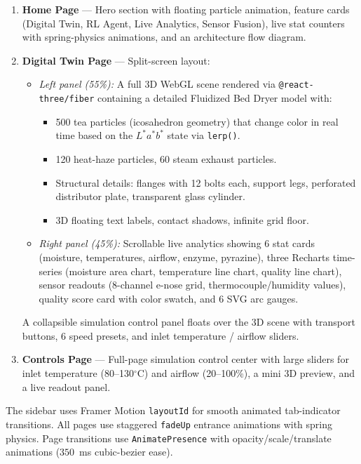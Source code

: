 ﻿\documentclass[12pt, a4paper]{report}
\begin{document}
\begin{enumerate}
    \item \textbf{Home Page} --- Hero section with floating particle animation, feature cards (Digital Twin, RL Agent, Live Analytics, Sensor Fusion), live stat counters with spring-physics animations, and an architecture flow diagram.

    \item \textbf{Digital Twin Page} --- Split-screen layout:
    \begin{itemize}
        \item \emph{Left panel (55\%):} A full 3D WebGL scene rendered via \texttt{@react-three/fiber} containing a detailed Fluidized Bed Dryer model with:
        \begin{itemize}
            \item 500 tea particles (icosahedron geometry) that change color in real time based on the $L^*a^*b^*$ state via \texttt{lerp()}.
            \item 120 heat-haze particles, 60 steam exhaust particles.
            \item Structural details: flanges with 12 bolts each, support legs, perforated distributor plate, transparent glass cylinder.
            \item 3D floating text labels, contact shadows, infinite grid floor.
        \end{itemize}
        \item \emph{Right panel (45\%):} Scrollable live analytics showing 6 stat cards (moisture, temperatures, airflow, enzyme, pyrazine), three Recharts time-series (moisture area chart, temperature line chart, quality line chart), sensor readouts (8-channel e-nose grid, thermocouple/humidity values), quality score card with color swatch, and 6 SVG arc gauges.
    \end{itemize}
    A collapsible simulation control panel floats over the 3D scene with transport buttons, 6 speed presets, and inlet temperature / airflow sliders.

    \item \textbf{Controls Page} --- Full-page simulation control center with large sliders for inlet temperature (80--130$^\circ$C) and airflow (20--100\%), a mini 3D preview, and a live readout panel.
\end{enumerate}

The sidebar uses Framer Motion \texttt{layoutId} for smooth animated tab-indicator transitions. All pages use staggered \texttt{fadeUp} entrance animations with spring physics. Page transitions use \texttt{AnimatePresence} with opacity/scale/translate animations ($350$~ms cubic-bezier ease).
\end{document}
